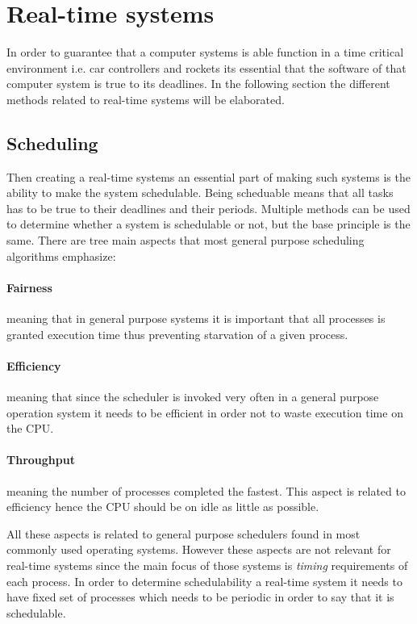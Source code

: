 \section{Real-time systems}
In order to guarantee that a computer systems is able function in a time critical environment i.e. car controllers and rockets its essential that the software of that computer system is true to its deadlines. 
In the following section the different methods related to real-time systems will be elaborated.

\subsection{Scheduling}
Then creating a real-time systems an essential part of making such systems is the ability to make the system schedulable.
Being scheduable means that all tasks has to be true to their deadlines and their periods. 
Multiple methods can be used to determine whether a system is schedulable or not, but the base principle is the same. 
There are tree main aspects that most general purpose scheduling algorithms emphasize:
\paragraph{Fairness} meaning that in general purpose systems it is important that all processes is granted execution time thus preventing starvation of a given process. 
\paragraph{Efficiency} meaning that since the scheduler is invoked very often in a general purpose operation system it needs to be efficient in order not to waste execution time on the CPU. 
\paragraph{Throughput} meaning the number of processes completed the fastest.
This aspect is related to efficiency hence the CPU should be on idle as little as possible. 

All these aspects is related to general purpose schedulers found in most commonly used operating systems. 
However these aspects are not relevant for real-time systems since the main focus of those systems is \textit{timing} requirements of each process.
In order to determine schedulability a real-time system it needs to have fixed set of processes which needs to be periodic in order to say that it is schedulable.


